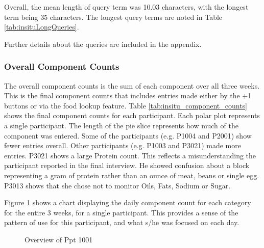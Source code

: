 Overall, the mean length of query term was 10.03 characters, with the longest term being 35 characters. The longest query terms are noted in Table \ref{tab:insituLongQueries}.

Further details about the queries are included in the appendix. 


\subsubsection{Overall Component Counts}
The overall component counts is the sum of each component over all three weeks. This is the final component counts that includes entries made either by the +1 buttons or via the food lookup feature. Table \ref{tab:insitu_component_counts} shows the final component counts for each participant. Each polar plot represents a single participant. The length of the pie slice represents how much of the component was entered. Some of the participants (e.g. P1004 and P2001) show fewer entries overall. Other participants (e.g. P1003 and P3021) made more entries. P3021 shows a large Protein count. This reflects a misunderstanding the participant reported in the final interview. He showed confusion about a block representing a gram of protein rather than an ounce of meat, beans or single egg. P3013 shows that she chose not to monitor Oils, Fats, Sodium or Sugar. 

Figure \ref{fig:ppt_overview} shows a chart displaying the daily component count for each category for the entire 3 weeks, for a single participant. This provides a sense of the pattern of use for this participant, and what s/he was focused on each day. 

\begin{figure}[ h ]
\begin{center}
\setlength\fboxsep{0pt}
\setlength\fboxrule{0.5pt}
\label{fig:ppt_overview}

\caption{Overview of Ppt 1001}
\end{center}
\end{figure}

